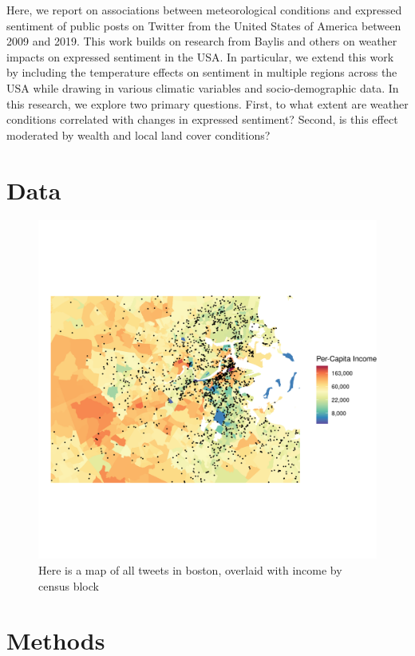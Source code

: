 \documentclass{article}
\begin{document}
Here, we report on associations between meteorological conditions and expressed sentiment of public posts on Twitter from the United States of America between 2009 and 2019. This work builds on research from Baylis and others \cite{baylis_weather_2018} on weather impacts on expressed sentiment in the USA. In particular, we extend this work by including the temperature effects on sentiment in multiple regions across the USA while drawing in various climatic variables and socio-demographic data. In this research, we explore two primary questions. First, to what extent are weather conditions correlated with changes in expressed sentiment? Second, is this effect moderated by wealth and local land cover conditions?

\section{Data}

\begin{figure}[H]
  \centering
  \includegraphics[width=\linewidth]{../res/Boston_Map.png}
  \caption{Here is a map of all tweets in boston, overlaid with income by census block}
  \label{fig:timeseries}
\end{figure}

\section{Methods}
\end{document}
